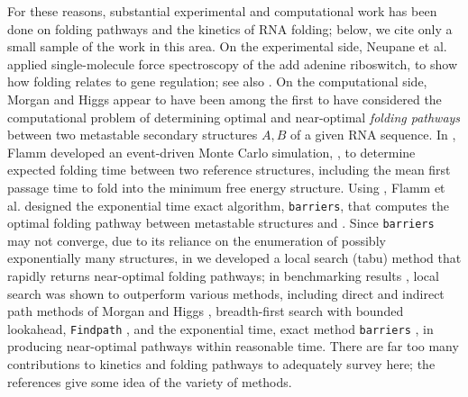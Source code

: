 For these reasons, substantial experimental and computational work
has been done on folding pathways and the kinetics of RNA folding;
below, we cite only a small sample of the work in this area.
On the experimental side,
Neupane et al. \citep{Neupane.nar11} applied single-molecule force spectroscopy
of the add adenine riboswitch, to show how folding  relates to
gene regulation;
see also \citep{Woodside.cocb08,Baird.jacs10,Mitra.r11}.
%
On the computational side, Morgan and Higgs \citep{morganHiggsBarrier}
appear to have been among the first
to have considered the computational problem of determining optimal and
near-optimal {\em folding pathways} between two metastable secondary
structures $A,B$ of a given RNA sequence.  In \citep{flammPhD}, Flamm
developed an event-driven Monte Carlo simulation, \kinfold,
to determine expected
folding time between two reference structures, including the mean first
passage time to fold into the minimum free energy structure.
Using \rnasub  \citep{Wuchty.b99}, Flamm et al.
\citep{flamm} designed the exponential
time exact algorithm, {\tt barriers}, that computes the optimal folding
pathway between metastable structures \strA and \strB. Since {\tt barriers}
may not converge, due to its reliance on the enumeration of possibly
exponentially many structures, in \citep{Dotu.nar10} we developed a
local search (tabu) method that rapidly returns near-optimal folding
pathways; in benchmarking results \citep{Dotu.nar10}, local search was shown
to outperform various methods, including direct and indirect path methods
of Morgan and Higgs \citep{morganHiggsBarrier}, breadth-first search with
bounded lookahead, {\tt Findpath} \citep{Flamm.r01}, and the
exponential time, exact method {\tt barriers} \citep{flamm}, in producing
near-optimal pathways within
reasonable time.
There are far too many contributions to kinetics and folding pathways
to adequately survey here; the references
\citep{Xayaphoummine.nar05,Tang.jmb08,Geis.jmb08,Zhao.bj10,Li.bb12}
give some idea of the variety of methods.


